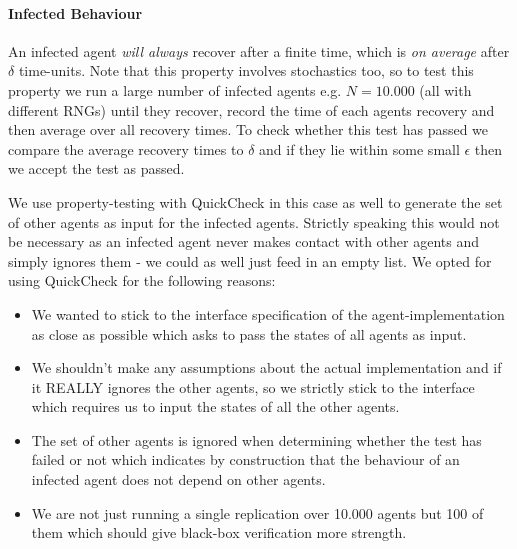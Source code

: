 
\paragraph{Infected Behaviour}
An infected agent \textit{will always} recover after a finite time, which is \textit{on average} after $\delta$ time-units. Note that this property involves stochastics too, so to test this property we run a large number of infected agents e.g. $N = 10.000$ (all with different RNGs) until they recover, record the time of each agents recovery and then average over all recovery times. To check whether this test has passed we compare the average recovery times to $\delta$ and if they lie within some small $\epsilon$ then we accept the test as passed.

We use property-testing with QuickCheck in this case as well to generate the set of other agents as input for the infected agents. Strictly speaking this would not be necessary as an infected agent never makes contact with other agents and simply ignores them - we could as well just feed in an empty list. We opted for using QuickCheck for the following reasons:

\begin{itemize}
	\item We wanted to stick to the interface specification of the agent-implementation as close as possible which asks to pass the states of all agents as input.
	\item We shouldn't make any assumptions about the actual implementation and if it REALLY ignores the other agents, so we strictly stick to the interface which requires us to input the states of all the other agents.
	\item The set of other agents is ignored when determining whether the test has failed or not which indicates by construction that the behaviour of an infected agent does not depend on other agents.
	\item We are not just running a single replication over 10.000 agents but 100 of them which should give black-box verification more strength.
\end{itemize}


